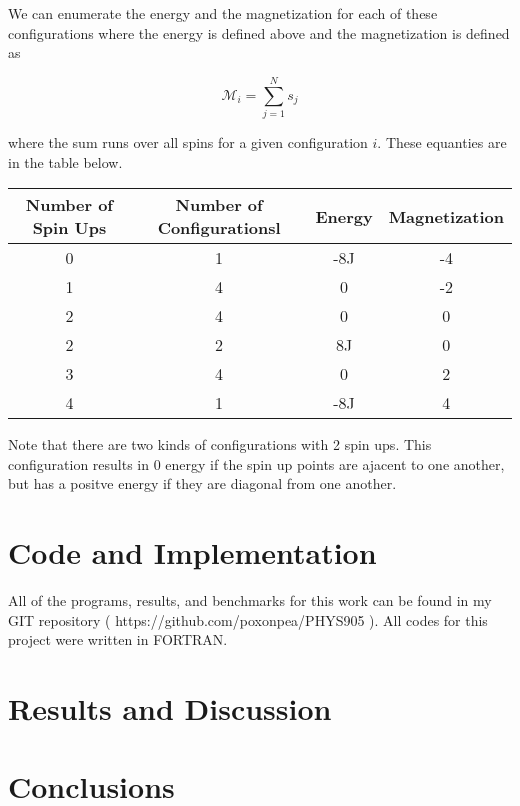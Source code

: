 \documentclass[%
oneside,                 %
final,                   %
10pt]{article}
\begin{document}
We can enumerate the energy and the magnetization for each of these configurations where the energy is defined above and the magnetization is defined as 

\begin{equation}
\mathcal{M}_i = \sum_{j=1}^N s_j
\end{equation}

where the sum runs over all spins for a given configuration $i$.  These equanties are in the table below.

\begin{center} 
\begin{tabular}{ |c|c|c|c| }
\hline
Number of Spin Ups & Number of Configurationsl & Energy & Magnetization \\
\hline
0 & 1 & -8J  & -4\\ 
1& 4  & 0  & -2\\ 
2 & 4 & 0  & 0\\ 
2 & 2 & 8J & 0 \\
3 & 4 & 0  & 2\\ 
4 & 1 & -8J  & 4\\ 
\hline
\end{tabular}
\label{table:test}
\end{center}

Note that there are two kinds of configurations with 2 spin ups.  This configuration results in 0 energy if the spin up points are ajacent to one another, but has a positve energy if they are diagonal from one another.


\section{Code and Implementation}

All of the programs, results, and benchmarks for this work can be found in my GIT repository ( https://github.com/poxonpea/PHYS905 ).  All codes for this project were written in FORTRAN.

\section{Results and Discussion}


\section{Conclusions}
\end{document}
